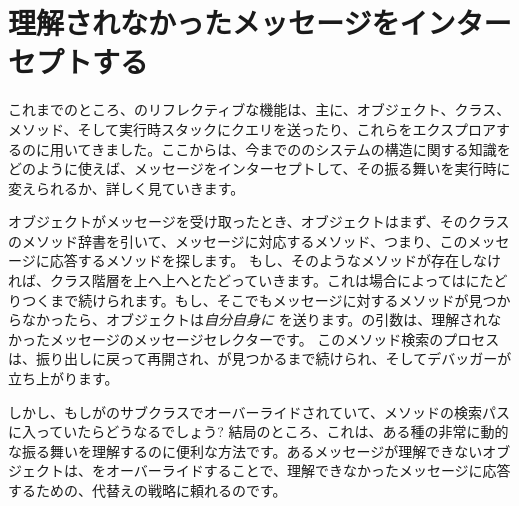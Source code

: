 \documentclass[a4paper,10pt,twoside]{book}
\begin{document}
\section{理解されなかったメッセージをインターセプトする}

これまでのところ、\st{}のリフレクティブな機能は、主に、オブジェクト、クラス、メソッド、そして実行時スタックにクエリを送ったり、これらをエクスプロアするのに用いてきました。ここからは、今までの\st{}のシステムの構造に関する知識をどのように使えば、メッセージをインターセプトして、その振る舞いを実行時に変えられるか、詳しく見ていきます。

オブジェクトがメッセージを受け取ったとき、オブジェクトはまず、そのクラスのメソッド辞書を引いて、メッセージに対応するメソッド、つまり、このメッセージに応答するメソッドを探します。
もし、そのようなメソッドが存在しなければ、クラス階層を上へ上へとたどっていきます。これは場合によってはにたどりつくまで続けられます。もし、そこでもメッセージに対するメソッドが見つからなかったら、オブジェクトは\emph{自分自身に} を送ります。の引数は、理解されなかったメッセージのメッセージセレクターです。%
このメソッド検索のプロセスは、振り出しに戻って再開され、が見つかるまで続けられ、そしてデバッガーが立ち上がります。

しかし、もしがのサブクラスでオーバーライドされていて、メソッドの検索パスに入っていたらどうなるでしょう?
結局のところ、これは、ある種の非常に動的な振る舞いを理解するのに便利な方法です。あるメッセージが理解できないオブジェクトは、をオーバーライドすることで、理解できなかったメッセージに応答するための、代替えの戦略に頼れるのです。
\end{document}

